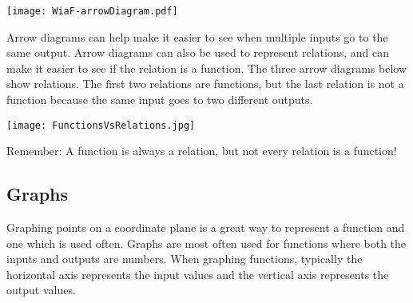 \documentclass[noauthor, nooutcomes]{ximera}
\begin{document}
\begin{image}
\texttt{[image: WiaF-arrowDiagram.pdf]}
\end{image}

Arrow diagrams can help make it easier to see when multiple inputs go to the same output.  Arrow diagrams can also be used to represent relations, and can make it easier to see if the relation is a function. The three arrow diagrams below show relations.  The first two relations are functions, but the last relation is not a function because the same input goes to two different outputs.

\begin{image}
\texttt{[image: FunctionsVsRelations.jpg]}  
\end{image}


\begin{remark}
Remember: A function is always a relation, but not every relation is a function!
\end{remark}

\subsection{Graphs}
Graphing points on a coordinate plane is a great way to represent a function and one which is used often.  Graphs are most often used for functions where both the inputs and outputs are numbers.  When graphing functions, typically the horizontal axis represents the input values and the vertical axis represents the output values.
\end{document}
